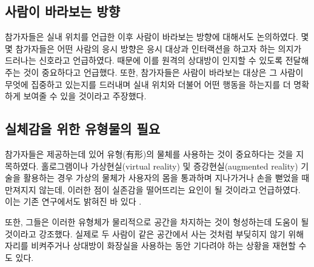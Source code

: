 \subsection{사람이 바라보는 방향}
참가자들은 실내 위치를 언급한 이후 사람이 바라보는 방향에 대해서도 논의하였다. 몇몇 참가자들은 어떤 사람의 응시 방향은 응시 대상과 인터랙션을 하고자 하는 의지가 드러나는 신호라고 언급하였다. 때문에 이를 원격의 상대방이 인지할 수 있도록 전달해 주는 것이 중요하다고 언급했다. 또한, 참가자들은 사람이 바라보는 대상은 그 사람이 무엇에 집중하고 있는지를 드러내며 실내 위치와 더불어 어떤 행동을 하는지를 더 명확하게 보여줄 수 있을 것이라고 주장했다.

\subsection{실체감을 위한 유형물의 필요}

참가자들은 \concept\을 제공하는데 있어 유형(有形)의 물체를 사용하는 것이 중요하다는 것을 지목하였다.
홀로그램이나 가상현실(virtual reality) 및 증강현실(augmented reality) 기술을 활용하는 경우 가상의 물체가 사용자의 몸을 통과하며 지나가거나 손을 뻗었을 때 만져지지 않는데, 이러한 점이 실존감을 떨어뜨리는 요인이 될 것이라고 언급하였다.
이는 기존 연구에서도 밝혀진 바 있다 \cite{azmandian2016haptic}.

또한, 그들은 이러한 유형체가 물리적으로 공간을 차지하는 것이 \concept\을 형성하는데 도움이 될 것이라고 강조했다. 실제로 두 사람이 같은 공간에서 사는 것처럼 부딪히지 않기 위해 자리를 비켜주거나 상대방이 화장실을 사용하는 동안 기다려야 하는 상황을 재현할 수도 있다.